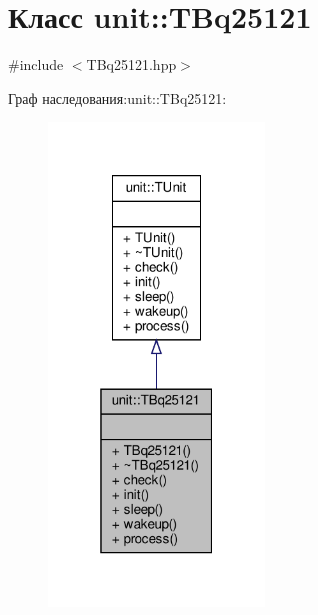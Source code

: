 \hypertarget{classunit_1_1_t_bq25121}{}\section{Класс unit\+:\+:T\+Bq25121}
\label{classunit_1_1_t_bq25121}


{\ttfamily \#include $<$T\+Bq25121.\+hpp$>$}



Граф наследования\+:unit\+:\+:T\+Bq25121\+:\nopagebreak
\begin{figure}[H]
\begin{center}
\leavevmode
\includegraphics[width=163pt]{classunit_1_1_t_bq25121__inherit__graph}
\end{center}
\end{figure}


